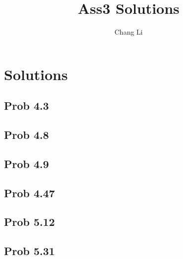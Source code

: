 \documentclass[10pt,a4paper]{article}
\begin{document}
\title{Ass3 Solutions}
\author{Chang Li}
\maketitle

\section{Solutions}

\subsection{Prob 4.3}

\subsection{Prob 4.8}

\subsection{Prob 4.9}

\subsection{Prob 4.47}

\subsection{Prob 5.12}

\subsection{Prob 5.31}


	\renewcommand\refname{Bibliography}
	
	
\end{document}
